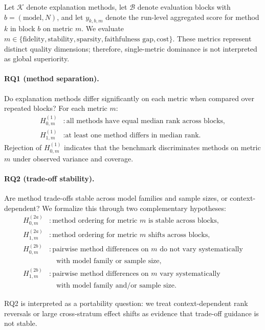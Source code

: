 \documentclass[twoside,11pt]{article}
\begin{document}
Let $\mathcal{K}$ denote explanation methods, let $\mathcal{B}$ denote
evaluation blocks with $b=(\text{model},N)$, and let $y_{k,b,m}$ denote the
run-level aggregated score for method $k$ in block $b$ on metric $m$.
We evaluate
$m \in \{\text{fidelity}, \text{stability}, \text{sparsity},
\text{faithfulness gap}, \text{cost}\}$.
These metrics represent distinct quality dimensions; therefore,
single-metric dominance is not interpreted as global superiority.

\paragraph{RQ1 (method separation).}
Do explanation methods differ significantly on each metric when compared over
repeated blocks?
For each metric $m$:
\begin{align}
H_{0,m}^{(1)} &: \text{all methods have equal median rank across blocks},\\
H_{1,m}^{(1)} &: \text{at least one method differs in median rank.}
\end{align}
Rejection of $H_{0,m}^{(1)}$ indicates that the benchmark discriminates methods
on metric $m$ under observed variance and coverage.

\paragraph{RQ2 (trade-off stability).}
Are method trade-offs stable across model families and sample sizes, or
context-dependent?
We formalize this through two complementary hypotheses:
\begin{align}
H_{0,m}^{(2a)} &: \text{method ordering for metric } m \text{ is stable across blocks},\\
H_{1,m}^{(2a)} &: \text{method ordering for metric } m \text{ shifts across blocks},\\
H_{0,m}^{(2b)} &: \text{pairwise method differences on } m \text{ do not vary systematically}\\
              &\quad \text{with model family or sample size},\\
H_{1,m}^{(2b)} &: \text{pairwise method differences on } m \text{ vary systematically}\\
              &\quad \text{with model family and/or sample size.}
\end{align}

RQ2 is interpreted as a portability question: we treat context-dependent rank
reversals or large cross-stratum effect shifts as evidence that trade-off
guidance is not stable.
\end{document}

